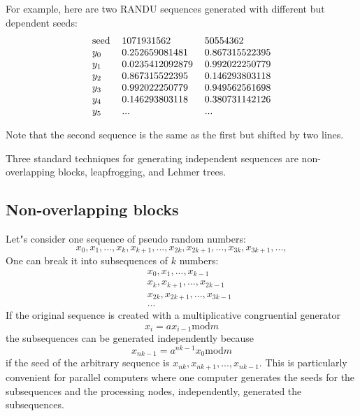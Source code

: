\documentclass[justified, sixbynine]{tufte-book}
\theoremstyle{plain}%
\newtheorem * {corollary}{Corollary}
\theoremstyle{definition}
\theoremstyle{remark}
\newtheorem * {remark}{Remark}
\newtheorem * {note}{Note}
\begin{document}
\begin{fullwidth}
For example, here are two RANDU sequences generated with different but dependent
seeds:
\begin{equation}
\begin{tabular}{lll}
seed & 1071931562 & 50554362 \\
$y_0$ & 0.252659081481 & 0.867315522395 \\
$y_1$ & 0.0235412092879 & 0.992022250779 \\
$y_2$ & 0.867315522395 & 0.146293803118 \\
$y_3$ & 0.992022250779 & 0.949562561698 \\
$y_4$ & 0.146293803118 & 0.380731142126 \\
$y_5$ & ... & ...
\end{tabular}
\end{equation}

Note that the second sequence is the same as the first but shifted by two
lines.

Three standard techniques for generating independent sequences are
non-overlapping blocks, leapfrogging, and Lehmer trees.

\goodbreak\subsection{Non-overlapping blocks}

Let"s consider one sequence of pseudo random numbers:
\begin{equation}
x_0, x_1, ..., x_k, x_{k+1}, ..., x_{2k}, x_{2k+1}, ..., x_{3k}, x_{3k+1}, ..., 
\end{equation}
One can break it into subsequences of $k$ numbers:
\begin{eqnarray}
&&x_0, x_1, ..., x_{k-1} \\
&&x_k, x_{k+1}, ..., x_{2k-1} \\
&&x_{2k}, x_{2k+1}, ..., x_{3k-1} \\
&&...
\end{eqnarray}
If the original sequence is created with a multiplicative congruential
generator
\begin{equation}
x_i=ax_{i-1}\textrm{mod}m
\end{equation}
the subsequences can be generated independently because
\begin{equation}
x_{nk-1}=a^{nk-1}x_0\textrm{mod}m
\end{equation}
if the seed of the arbitrary sequence is $x_{nk}, x_{nk+1}, ..., x_{nk-1}$. This
is particularly convenient for parallel computers where one computer
generates the seeds for the subsequences and the processing nodes, 
independently, generated the subsequences.


\end{fullwidth}
\end{document}
